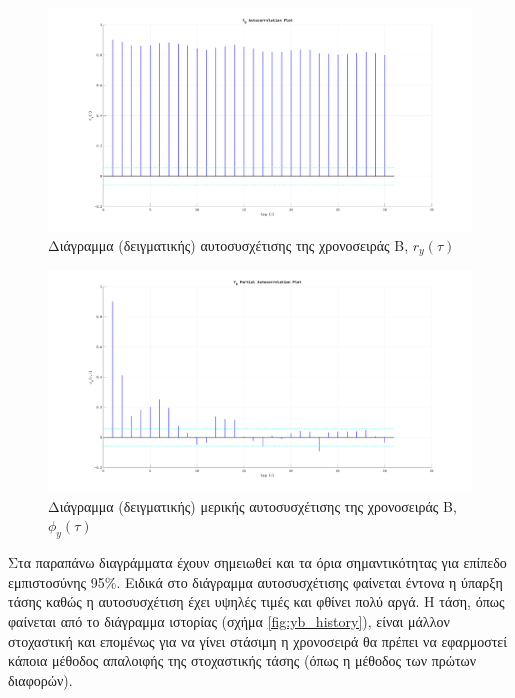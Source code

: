 \begin{figure}[H]
    \begin{center}
        \includegraphics[width=\textwidth]{plots/yb_initial_autocorrelation.svg.pdf}
        \caption{Διάγραμμα (δειγματικής) αυτοσυσχέτισης της χρονοσειράς B, $r_y(\tau)$}
        \label{fig:yb_initial_autocorrelation}
    \end{center}
\end{figure}

\begin{figure}[H]
    \begin{center}
        \includegraphics[width=\textwidth]{plots/yb_initial_partial_autocorrelation.svg.pdf}
        \caption{Διάγραμμα (δειγματικής) μερικής αυτοσυσχέτισης της χρονοσειράς B, $\phi_y(\tau)$}
        \label{fig:yb_initial_partial_autocorrelation}
    \end{center}
\end{figure}

Στα παραπάνω διαγράμματα έχουν σημειωθεί και τα όρια σημαντικότητας για επίπεδο εμπιστοσύνης 95\%. Ειδικά στο διάγραμμα αυτοσυσχέτισης φαίνεται έντονα η ύπαρξη τάσης καθώς η αυτοσυσχέτιση έχει υψηλές τιμές και φθίνει πολύ αργά. Η τάση, όπως φαίνεται από το διάγραμμα ιστορίας (σχήμα \ref{fig:yb_history}), είναι μάλλον στοχαστική και επομένως για να γίνει στάσιμη η χρονοσειρά θα πρέπει να εφαρμοστεί κάποια μέθοδος απαλοιφής της στοχαστικής τάσης (όπως η μέθοδος των πρώτων διαφορών).

